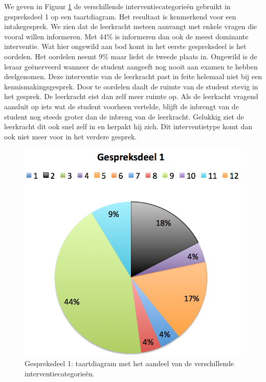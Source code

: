 \documentclass[a4paper,12pt]{article}
\theoremstyle{definition}
\begin{document}
We geven in Figuur \ref{7} de verschillende interventiecategorieën gebruikt in gespreksdeel 1 op een 
taartdiagram. Het resultaat is kenmerkend voor een intakegesprek. We zien dat de 
leerkracht meteen aanvangt met enkele vragen die vooral willen informeren. Met 
44\% is informeren dan ook de meest dominante interventie. Wat hier ongewild 
aan bod komt in het eerste gespreksdeel is het oordelen. Het oordelen neemt 9\% maar liefst de tweede plaats in. 
Ongewild is de leraar geënerveerd wanneer de student aangeeft nog nooit aan examen te hebben 
deelgenomen. Deze interventie van de leerkracht past in feite helemaal niet bij 
een kennismakingsgesprek. Door te oordelen daalt de ruimte van de student stevig in het gesprek. De leerkracht eist dan zelf meer ruimte op. Als de leerkacht
vragend aansluit op iets wat de student voorheen vertelde, blijft de inbrengt van de student nog steeds groter dan de inbreng van de leerkracht.
Gelukkig ziet de leerkracht dit ook snel zelf in en 
herpakt hij zich. Dit interventietype komt dan ook niet meer voor in het verdere 
gesprek.\\
\begin{figure}[h]
  \centering
  \includegraphics[scale=0.6]{grafiek7.png}\caption{Gespreksdeel 1: taartdiagram met het aandeel van de verschillende interventiecategorieën.}\label{7}
\end{figure}
\end{document}
